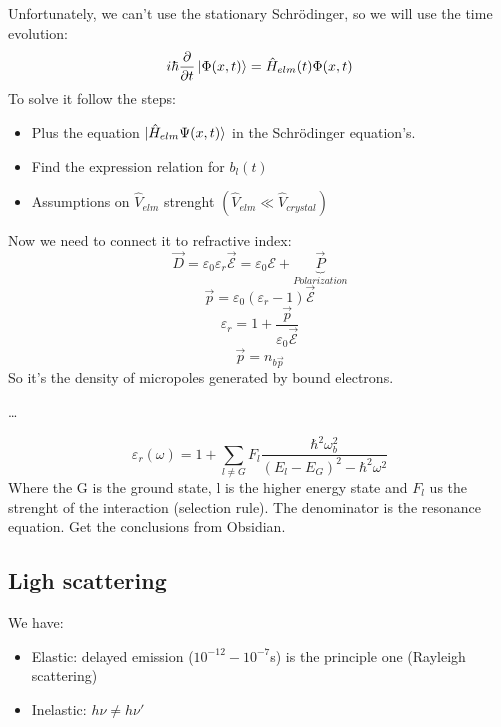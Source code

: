 Unfortunately, we can't use the stationary Schr\"{o}dinger, so we will use the time evolution:
\begin{equation}
    i\hbar\frac{\partial}{\partial t} \ket{\Phi(x,t)} = \hat{H}_{elm}(t)\Phi(x, t)
\end{equation}
To solve it follow the steps:
\begin{itemize}
    \item Plus the equation $\ket{\hat{H}_{elm}\Psi(x,t)}$ in the Schr\"odinger equation's.
    \item Find the expression relation for ${b_l(t)}$
    \item Assumptions on $\hat{V}_{elm}$ strenght $(\hat{V}_{elm} \ll \hat{V}_{crystal})$
\end{itemize}
Now we need to connect it to refractive index:
\begin{equation}
    \vec{D} = \varepsilon_0\varepsilon_r \vec{\mathcal{E}} = \varepsilon_0 \mathcal{E} + \underbrace{\vec{P}}_{Polarization}
\end{equation}
\begin{equation}
    \vec{p} = \varepsilon_0 (\varepsilon_r - 1) \vec{\mathcal{E}}
\end{equation}
\begin{equation}
    \varepsilon_r = 1 + \frac{\vec{p}}{\varepsilon_0 \vec{\mathcal{E}}} 
\end{equation}
\begin{equation}
    \vec{p} = n_{b\vec{p}}
\end{equation}
So it's the density of micropoles generated by bound electrons.

\vspace{15pt}

\dots

\vspace{15pt}
\begin{equation}
    \varepsilon_r(\omega) = 1 + \sum_{l\neq G}{F_l\frac{\hbar^2\omega^2_b}{(E_l - E_G)^2 - \hbar^2\omega^2}}
\end{equation}
Where the G is the ground state, l is the higher energy state and $F_l$ us the strenght of the interaction (selection rule).
The denominator is the resonance equation. Get the conclusions from Obsidian.

\subsection{Ligh scattering}
We have:
\begin{itemize}
    \item Elastic: delayed emission ($10^{-12} - 10^{-7}$s) is the principle one (Rayleigh scattering)
    \item Inelastic: $h\nu \neq h\nu'$
\end{itemize}